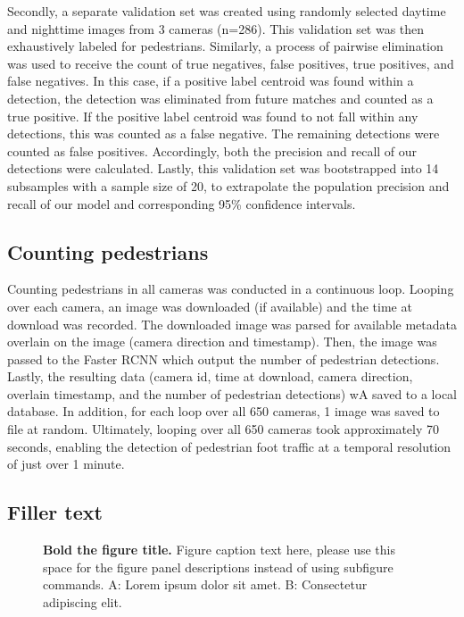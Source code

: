 \documentclass[10pt,letterpaper]{article}
\begin{document}
Secondly, a separate validation set was created using randomly selected daytime and nighttime images from 3 cameras (n=286). This validation set was then exhaustively labeled for pedestrians. Similarly, a process of pairwise elimination was used to receive the count of true negatives, false positives, true positives, and false negatives. In this case, if a positive label centroid was found within a detection, the detection was eliminated from future matches and counted as a true positive. If the positive label centroid was found to not fall within any detections, this was counted as a false negative. The remaining detections were counted as false positives. Accordingly, both the precision and recall of our detections were calculated. Lastly, this validation set was bootstrapped into 14 subsamples with a sample size of 20, to extrapolate the population precision and recall of our model and corresponding 95\% confidence intervals.

\subsection*{Counting pedestrians}
Counting pedestrians in all cameras was conducted in a continuous loop. Looping over each camera, an image was downloaded (if available) and the time at download was recorded. The downloaded image was parsed for available metadata overlain on the image (camera direction and timestamp). Then, the image was passed to the Faster RCNN which output the number of pedestrian detections. Lastly, the resulting data (camera id, time at download, camera direction, overlain timestamp, and the number of pedestrian detections) wA saved to a local database. In addition, for each loop over all 650 cameras, 1 image was saved to file at random. Ultimately, looping over all 650 cameras took approximately 70 seconds, enabling the detection of pedestrian foot traffic at a temporal resolution of just over 1 minute.

\subsection*{Filler text}
\begin{figure}[!h]
\caption{{\bf Bold the figure title.}
Figure caption text here, please use this space for the figure panel descriptions instead of using subfigure commands. A: Lorem ipsum dolor sit amet. B: Consectetur adipiscing elit.}
\label{fig1}
\end{figure}
\end{document}

